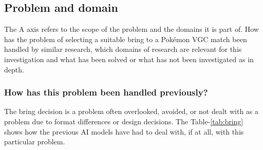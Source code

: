 \documentclass[conference]{IEEEtran}
\begin{document}
\subsection{Problem and domain}
The A axis refers to the scope of the problem and the domains it is part of. How has the problem of selecting a suitable bring to a Pokémon VGC match been handled by similar research, which domains of research are relevant for this investigation and what has been solved or what has not been investigated as in depth.  
\subsubsection{How has this problem been handled previously?}

The bring decision is a problem often overlooked, avoided, or not dealt with as a problem due to format differences or design decisions. The Table-\ref{tab:bring} shows how the previous AI models have had to deal with, if at all, with this particular problem.
\end{document}
